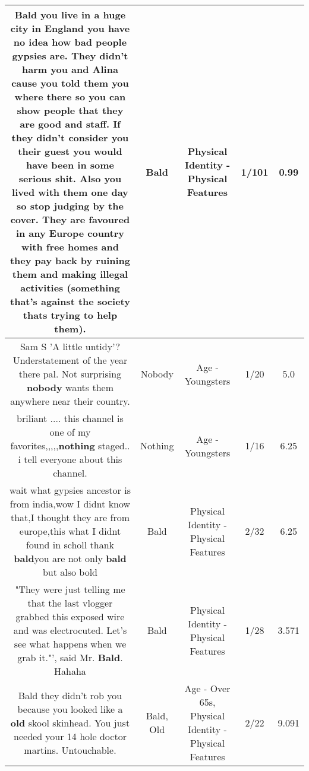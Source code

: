\documentclass[11pt]{article}
\newlength\mylength
\begin{document}
\begin{center}
\begin{longtable}{|C{.65\mylength}|C{.30\mylength}|C{.12\mylength}|C{.12\mylength}|C{.12\mylength}|}
  \small Bald you live in a huge city in England you have no idea how bad people gypsies are. They didn't harm you and Alina cause you told them you where there so you can show people that they are good and staff. If they didn't consider you their guest you would have been in some serious shit. Also you lived with them one day so stop judging by the cover. They are favoured in any Europe country with free homes and they pay back by ruining them and making illegal activities (something that's against the society thats trying to help them).\normalsize   & Bald & Physical Identity - Physical Features & 1/101 & 0.99 \\  \hline
  \small Sam S 'A little untidy'? Understatement of the year there pal. Not surprising \textbf{nobody} wants them anywhere near their country.\normalsize   & Nobody & Age - Youngsters & 1/20 & 5.0 \\  \hline
  \small briliant .... this channel is one of my favorites,,,,,\textbf{nothing} staged.. i tell everyone about this channel.\normalsize   & Nothing & Age - Youngsters & 1/16 & 6.25 \\  \hline
  \small wait what gypsies ancestor is from india,wow I didnt know that,I thought they are from europe,this what I didnt found in scholl thank \textbf{bald}you are not only \textbf{bald} but also bold\normalsize   & Bald & Physical Identity - Physical Features & 2/32 & 6.25 \\  \hline
  \small "They were just telling me that the last vlogger grabbed this exposed wire and was electrocuted.  Let's see what happens when we grab it."', said Mr. \textbf{Bald}.  Hahaha\normalsize   & Bald & Physical Identity - Physical Features & 1/28 & 3.571 \\  \hline
  \small Bald they didn't rob you because you looked like a \textbf{old} skool skinhead. You just needed your 14 hole doctor martins. Untouchable.\normalsize   & Bald, Old & Age - Over 65s, Physical Identity - Physical Features & 2/22 & 9.091 \\  \hline

\end{longtable}
\end{center}
\end{document}
